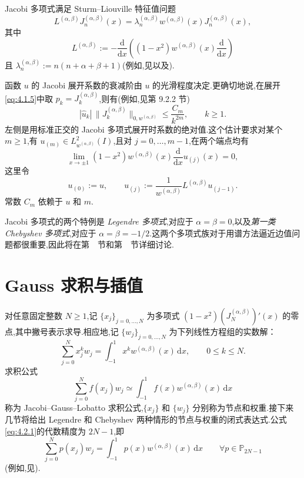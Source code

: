 Jacobi 多项式满足 Sturm--Liouville 特征值问题
\begin{equation}\label{eq:4.1.13}
  L^{(\alpha,\beta)}J_n^{(\alpha,\beta)}(x)
   =\lambda_n^{(\alpha,\beta)}w^{(\alpha,\beta)}(x)J_n^{(\alpha,\beta)}(x),
\end{equation}
其中
\[
  L^{(\alpha,\beta)}:=-\frac{\mathrm d}{\mathrm dx}
    \left((1-x^2)w^{(\alpha,\beta)}(x)\frac{\mathrm d}{\mathrm dx}\right)
\]
且 \(\lambda_n^{(\alpha,\beta)}:=n(n+\alpha+\beta+1)\)(例如,见以及).

函数 \(u\) 的 Jacobi 展开系数的衰减阶由 \(u\) 的光滑程度决定.更确切地说,在展开\eqref{eq:4.1.5}中取 \(p_k=J_k^{(\alpha,\beta)}\),则有(例如,见第 9.2.2 节)
\begin{equation}\label{eq:4.1.14}
  |\widehat u_k|\,\|J_k^{(\alpha,\beta)}\|_{0,w^{(\alpha,\beta)}}
  \le\frac{C_m}{k^{2m}},\qquad k\ge1.
\end{equation}
左侧是用标准正交的 Jacobi 多项式展开时系数的绝对值.这个估计要求对某个 \(m\ge1\),有 \(u_{(m)}\in L^2_{w^{(\alpha,\beta)}}(I)\),且对 \(j=0,\ldots,m-1\),在两个端点均有
\[
  \lim_{x\to\pm1}(1-x^2)w^{(\alpha,\beta)}(x)\frac{\mathrm d}{\mathrm dx}u_{(j)}(x)=0,
\]
这里令
\[
  u_{(0)}:=u,\qquad
  u_{(j)}:=\frac1{w^{(\alpha,\beta)}}L^{(\alpha,\beta)}u_{(j-1)}.
\]
常数 \(C_m\) 依赖于 \(u\) 和 \(m\).

Jacobi 多项式的两个特例是 \emph{Legendre 多项式},对应于 \(\alpha=\beta=0\),以及\emph{第一类 Chebyshev 多项式},对应于 \(\alpha=\beta=-1/2\).这两个多项式族对于用谱方法逼近边值问题都很重要,因此将在第~~节和第~~节详细讨论.

\section{Gauss 求积与插值}\label{sec:4.2}

对任意固定整数 \(N\ge1\),记 \(\{x_j\}_{j=0,\ldots,N}\) 为多项式 \((1-x^2)(J_N^{(\alpha,\beta)})'(x)\) 的零点,其中撇号表示求导.相应地,记 \(\{w_j\}_{j=0,\ldots,N}\) 为下列线性方程组的实数解：
\[
  \sum_{j=0}^N x_j^k w_j
  =\int_{-1}^1x^k w^{(\alpha,\beta)}(x)\,\mathrm dx,\qquad 0\le k\le N.
\]
求积公式
\begin{equation}\label{eq:4.2.1}
  \sum_{j=0}^N f(x_j)w_j
   \simeq\int_{-1}^1 f(x)w^{(\alpha,\beta)}(x)\,\mathrm dx
\end{equation}
称为 Jacobi--Gauss--Lobatto 求积公式,\(\{x_j\}\) 和 \(\{w_j\}\) 分别称为节点和权重.接下来几节将给出 Legendre 和 Chebyshev 两种情形的节点与权重的闭式表达式.公式\eqref{eq:4.2.1}的代数精度为 \(2N-1\),即
\begin{equation}\label{eq:4.2.2}
  \sum_{j=0}^N p(x_j)w_j=\int_{-1}^1p(x)w^{(\alpha,\beta)}(x)\,\mathrm dx
  \qquad\forall p\in\mathbb P_{2N-1}
\end{equation}
(例如,见).

